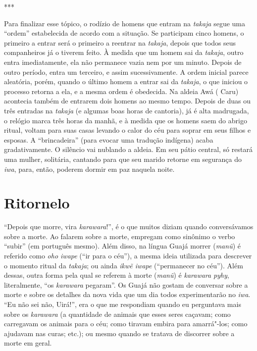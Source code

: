 \begin{center}
***
\end{center}

Para finalizar esse tópico, o rodízio de homens que entram na
\emph{takaja} segue uma ``ordem'' estabelecida de acordo com a situação.
Se participam cinco homens, o primeiro a entrar será o primeiro a
reentrar na \emph{takaja}, depois que todos seus companheiros já o
tiverem feito. À medida que um homem sai da \emph{takaja}, outro entra
imediatamente, ela não permanece vazia nem por um minuto. Depois de
outro período, entra um terceiro, e assim sucessivamente. A ordem
inicial parece aleatória, porém, quando o último homem a entrar sai da
\emph{takaja}, o que iniciou o processo retorna a ela, e a mesma ordem é
obedecida. Na aldeia Awá ( Caru) acontecia também de entrarem dois
homens ao mesmo tempo. Depois de duas ou três entradas na \emph{takaja}
(e algumas boas horas de cantoria), já é alta madrugada, o relógio marca
três horas da manhã, e à medida que os homens saem do abrigo ritual,
voltam para suas casas levando o calor do céu para soprar em seus filhos
e esposas. A ``brincadeira'' (para evocar uma tradução indígena) acaba
gradativamente. O silêncio vai nublando a aldeia. Em seu pátio central,
só restará uma mulher, solitária, cantando para que seu marido retorne
em segurança do \emph{iwa}, para, então, poderem dormir em paz naquela
noite.

\section{Ritornelo}\label{ritornelo}

``Depois que morre, vira \emph{karawara}!'', é o que muitos diziam quando
conversávamos sobre a morte. Ao falarem sobre a morte, empregam como
sinônimo o verbo ``subir'' (em português mesmo). Além disso, na língua
Guajá morrer (\emph{manũ}) é referido como \emph{oho iwape} (``ir para o
céu''), a mesma ideia utilizada para descrever o momento ritual da
\emph{takaja}; ou ainda \emph{ikwẽ iwape} (``permanecer no céu''). Além
dessas, outra forma pela qual se referem à morte (\emph{manũ}) é
\emph{karawara} \emph{pyhy}, literalmente, ``os \emph{karawara} pegaram''.
Os Guajá não gostam de conversar sobre a morte e sobre os detalhes da
nova vida que um dia todos experimentarão no \emph{iwa}. ``Eu não sei
não, Uirá!'', era o que me respondiam quando eu perguntava mais sobre os
\emph{karawara} (a quantidade de animais que esses seres caçavam; como
carregavam os animais para o céu; como tiravam embira para amarrá"-los;
como ajudavam nas curas; etc.); ou mesmo quando se tratava de discorrer
sobre a morte em geral.

